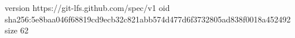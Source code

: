 version https://git-lfs.github.com/spec/v1
oid sha256:5e8baa046f68819cd9ecb32c821abb574d477d6f3732805ad838f0018a452492
size 62
